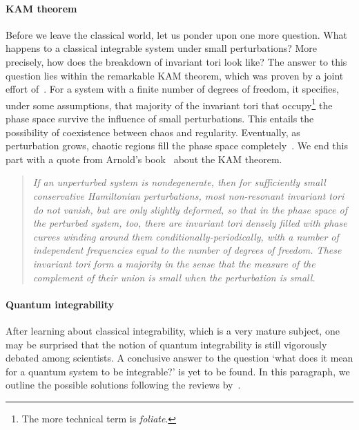 \paragraph{KAM theorem}Before we leave the classical world, let us ponder upon one more question.
What happens to a classical integrable system under small perturbations? More precisely,
how does the breakdown of invariant tori look like? The answer to this question lies
within the remarkable KAM theorem, which was proven by a joint effort
of~\textcite{Kolmogorov1954,Moser1962,Arnold1963}. For
a system with a finite number of degrees of freedom, it specifies, under some assumptions,
that majority of the invariant tori that occupy\footnote{The more technical term is
\textit{foliate}.} the phase space survive the influence of small perturbations. This entails
the possibility of coexistence between chaos and regularity. Eventually, as perturbation grows,
chaotic regions fill the phase space completely~\autocite{DAlessio2016}. We end this part
with a quote from Arnold's book~\autocite{arnold2013mathematical} about the KAM theorem.
\begin{quotation}
   \textit{ If an unperturbed system is nondegenerate, then for sufficiently
small conservative Hamiltonian perturbations, most non-resonant invariant
tori do not vanish, but are only slightly deformed, so that in the phase space
of the perturbed system, too, there are invariant tori densely filled with phase
curves winding around them conditionally-periodically, with a number of
independent frequencies equal to the number of degrees of freedom.
These invariant tori form a majority in the sense that the measure of the
complement of their union is small when the perturbation is small.}
\end{quotation}
\paragraph{Quantum integrability} After learning about classical integrability, which
is a very mature subject, one may be surprised that the notion of quantum integrability 
is still vigorously debated among scientists. A conclusive answer to the question
`what does it mean for a quantum system to be integrable?' is yet to be found.
In this paragraph, we outline the possible solutions following the reviews
by~\textcite{Caux2011,Yuzbashyan2013}.

